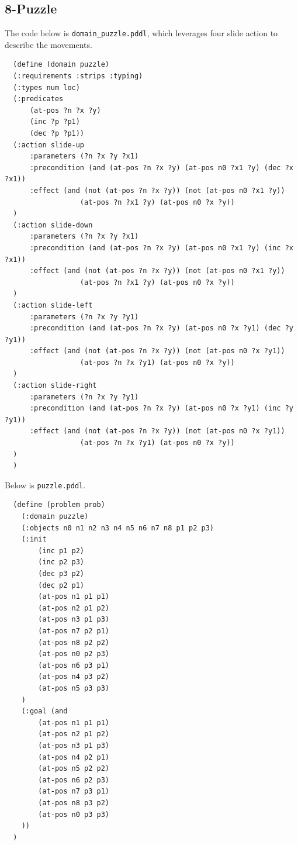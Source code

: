 ﻿\documentclass[a4paper, 11pt]{article}
\begin{document}
\subsection{8-Puzzle}
The code below is \verb'domain_puzzle.pddl', which leverages four slide action to describe the movements.
\begin{lstlisting}
  (define (domain puzzle)
  (:requirements :strips :typing)
  (:types num loc)
  (:predicates
      (at-pos ?n ?x ?y)
      (inc ?p ?p1)
      (dec ?p ?p1))
  (:action slide-up
      :parameters (?n ?x ?y ?x1)
      :precondition (and (at-pos ?n ?x ?y) (at-pos n0 ?x1 ?y) (dec ?x ?x1))
      :effect (and (not (at-pos ?n ?x ?y)) (not (at-pos n0 ?x1 ?y))
                  (at-pos ?n ?x1 ?y) (at-pos n0 ?x ?y))
  )
  (:action slide-down
      :parameters (?n ?x ?y ?x1)
      :precondition (and (at-pos ?n ?x ?y) (at-pos n0 ?x1 ?y) (inc ?x ?x1))
      :effect (and (not (at-pos ?n ?x ?y)) (not (at-pos n0 ?x1 ?y))
                  (at-pos ?n ?x1 ?y) (at-pos n0 ?x ?y))
  )
  (:action slide-left
      :parameters (?n ?x ?y ?y1)
      :precondition (and (at-pos ?n ?x ?y) (at-pos n0 ?x ?y1) (dec ?y ?y1))
      :effect (and (not (at-pos ?n ?x ?y)) (not (at-pos n0 ?x ?y1))
                  (at-pos ?n ?x ?y1) (at-pos n0 ?x ?y))
  )
  (:action slide-right
      :parameters (?n ?x ?y ?y1)
      :precondition (and (at-pos ?n ?x ?y) (at-pos n0 ?x ?y1) (inc ?y ?y1))
      :effect (and (not (at-pos ?n ?x ?y)) (not (at-pos n0 ?x ?y1))
                  (at-pos ?n ?x ?y1) (at-pos n0 ?x ?y))
  )
  )
\end{lstlisting}

Below is \verb'puzzle.pddl'.
\begin{lstlisting}
  (define (problem prob)
    (:domain puzzle)
    (:objects n0 n1 n2 n3 n4 n5 n6 n7 n8 p1 p2 p3)
    (:init
        (inc p1 p2)
        (inc p2 p3)
        (dec p3 p2)
        (dec p2 p1)
        (at-pos n1 p1 p1)
        (at-pos n2 p1 p2)
        (at-pos n3 p1 p3)
        (at-pos n7 p2 p1)
        (at-pos n8 p2 p2)
        (at-pos n0 p2 p3)
        (at-pos n6 p3 p1)
        (at-pos n4 p3 p2)
        (at-pos n5 p3 p3)
    )
    (:goal (and
        (at-pos n1 p1 p1)
        (at-pos n2 p1 p2)
        (at-pos n3 p1 p3)
        (at-pos n4 p2 p1)
        (at-pos n5 p2 p2)
        (at-pos n6 p2 p3)
        (at-pos n7 p3 p1)
        (at-pos n8 p3 p2)
        (at-pos n0 p3 p3)
    ))
  )
\end{lstlisting}
\end{document}
